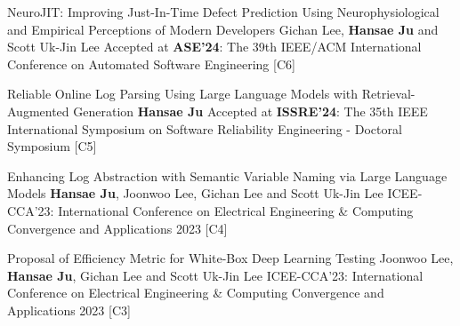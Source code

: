 

\begin{cventries}

\pbentry
  {NeuroJIT: Improving Just-In-Time Defect Prediction Using Neurophysiological and Empirical Perceptions of Modern Developers }  %
  {Gichan Lee, \textbf{Hansae Ju} and Scott Uk-Jin Lee}
  {Accepted at \textbf{ASE'24}: The 39th IEEE/ACM International Conference on Automated Software Engineering}
  {\href{https://doi.org/10.5281/zenodo.13372683}{\preprint}}
  {\href{https://github.com/Verssae/NeuroJIT}{\githubCode}}
  {[C6]}

 \pbentry
  {Reliable Online Log Parsing Using Large Language Models with Retrieval-Augmented Generation } %
  {\textbf{Hansae Ju}}
  {Accepted at \textbf{ISSRE'24}: The 35th IEEE International Symposium on Software Reliability Engineering - Doctoral Symposium}
  {}
  {\href{https://github.com/Verssae/RAGLogParser}{\githubCode}}
  {[C5]}


  \pbentry
  {Enhancing Log Abstraction with Semantic Variable Naming via Large Language Models } %
  {\textbf{Hansae Ju}, Joonwoo Lee, Gichan Lee and Scott Uk-Jin Lee}
  {ICEE-CCA'23: International Conference on Electrical Engineering \& Computing Convergence and Applications 2023}
  {\href{https://github.com/Verssae/Verssae/blob/3f89da13976aaa5cbd1e3bdce61926b392d6e797/assets/papers/ICEE-CCA\%2023/Enhancing\%20Log\%20Abstraction\%20with\%20Semantic\%20Variable\%20Naming\%20via\%20Large\%20Language\%20Models.pdf}{\paper}}
  {\href{https://github.com/Verssae/LogParsingGPT}{\githubCode}}
  {[C4]}

  \pbentry
  {Proposal of Efficiency Metric for White-Box Deep Learning Testing } %
  {Joonwoo Lee, \textbf{Hansae Ju}, Gichan Lee and Scott Uk-Jin Lee}
  {ICEE-CCA'23: International Conference on Electrical Engineering \& Computing Convergence and Applications 2023}
  {\href{https://github.com/Verssae/Verssae/blob/3f89da13976aaa5cbd1e3bdce61926b392d6e797/assets/papers/ICEE-CCA\%2023/Proposal\%20of\%20Efficiency\%20Metric\%20for\%20White-Box\%20Deep\%20Learning\%20Testing.pdf}{\paper}}
  {}
  {[C3]}


\end{cventries}
